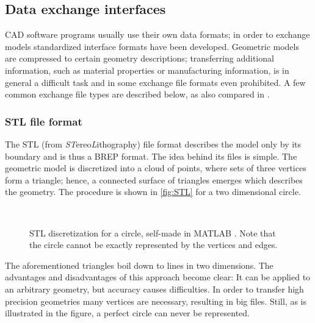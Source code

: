 \subsection{Data exchange interfaces}
CAD software programs usually use their own data formats; in order to exchange models standardized interface formats have been developed. Geometric models are compressed to certain geometry descriptions; transferring additional information, such as material properties or manufacturing information, is in general a difficult task and in some exchange file formats even prohibited. A few common exchange file types are described below, as also compared in \cite{STL}.
\subsubsection{STL file format} \label{subsub:STL}
The STL (from \emph{ST}ereo\emph{L}ithography) file format describes the model only by its boundary and is thus a BREP format. The idea behind its files is simple. The geometric model is discretized into a cloud of points, where sets of three vertices form a triangle; hence, a connected surface of triangles emerges which describes the geometry. The procedure is shown in \autoref{fig:STL} for a two dimensional circle.  
\begin{figure}
\centering
   \\
   \caption{STL discretization for a circle, self-made in MATLAB \cite{MATLAB}. Note that the circle cannot be exactly represented by the vertices and edges.}
   \label{fig:STL}
\end{figure}
The aforementioned triangles boil down to lines in two dimensions. The advantages and disadvantages of this approach become clear: It can be applied to an arbitrary geometry, but accuracy causes difficulties. In order to transfer high precision geometries many vertices are necessary, resulting in big files. Still, as is illustrated in the figure, a perfect circle can never be represented. 

